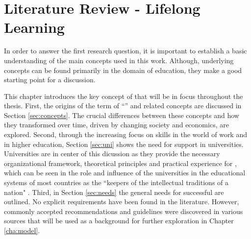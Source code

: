 \chapter{Literature Review - Lifelong Learning \label{cha:litrev}}

In order to answer the first research question, it is important to establish a
basic understanding of the main concepts used in this work. Although,
underlying concepts can be found primarily in the domain of education, they make
a good starting point for a discussion. 

This chapter introduces the key concept of \LLLs that will be in focus
throughout the thesis. First, the origins of the term of ``\LLLsn'' and related
concepts are discussed in Section \ref{sec:concepts}. The crucial differences
between these concepts and how they transformed over time, driven by changing society and
economics, are explored. Second, through the increasing focus on \LLLs skills in
the world of work and in higher education, Section \ref{sec:uni} shows the need
for \LLLs support in universities. Universities are in center of this
dicussion as they provide the necessary organizational framework, theoretical
principles and practical experience for \LLLs \citep{Knapper2000}, which can be
seen in the role and influence of the universities in the educational systems of
most countries as the ``keepers of the intellectual traditions of a nation"
\citep[p.~96]{Longworth2003}. Third, in Section \ref{sec:needs} the general
needs for successful \LLLs are outlined. No explicit requirements have been
found in the literature. However, commonly accepted recommendations and
guidelines were discovered in various sources that will be used as a background
for further exploration in Chapter \ref{cha:model}.

